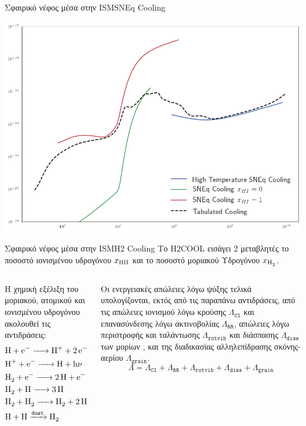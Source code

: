 \documentclass{beamer}
\begin{document}
\begin{frame}{Σφαιρικό νέφος μέσα στην ISM}{SNEq Cooling}
	
\begin{center}
	\includegraphics[width=0.85\linewidth]{../Document/DataImages/SNEQcooling-function}
\end{center}
\end{frame}

\begin{frame}{Σφαιρικό νέφος μέσα στην ISM}{Η2 Cooling}
	Το H2COOL εισάγει 2  μεταβλητές το ποσοστό ιονισμένου υδρογόνου $x_{\ce{HII}}$ και το ποσοστό μοριακού Υδρογόνου $x_{\ce{H2}}$.
	\begin{columns}
	Η χημική εξέλιξη του μοριακού, ατομικού και ιονισμένου υδρογόνου ακολουθεί τις αντιδράσεις:
		\begin{align}
		&\ce{H + e^- -> H^+ + 2e^-} \\
		&\ce{H^+ + e^- -> H + h\nu}\\
		&\ce{H_2 + e^- -> 2H + e^-} \\
		&\ce{H_2 + H -> 3H}\\
		&\ce{H_2 + H_2 -> H_2 + 2H} \\
		&\ce{H + H ->[\mathtt{dust}] H_2}
		\end{align}
	
		Οι ενεργειακές απώλειες λόγω ψύξης τελικά υπολογίζονται, εκτός από τις παραπάνω αντιδράσεις, από τις απώλειες ιονισμού λόγω κρούσης $\Lambda _{\mathtt{CI}}$ και επανασύνδεσης λόγω ακτινοβολίας $\Lambda _{\mathtt{RR}}$, απώλειες λόγω περιστροφής και ταλάντωσης $\Lambda _{\mathtt{rotvib}}$ και διάσπασης  $\Lambda _{\mathtt{diss}}$ των μορίων , και της διαδικασίας αλληλεπίδρασης σκόνης-αερίου $\Lambda _{\mathtt{grain}}$.
		\begin{equation}
		\Lambda = \Lambda _{\mathtt{CI}} + \Lambda _{\mathtt{RR}} +\Lambda _{\mathtt{rotvib}} + \Lambda _{\mathtt{diss}} + \Lambda _{\mathtt{grain}}
		\end{equation}
	\end{columns}
\end{frame}
\end{document}
